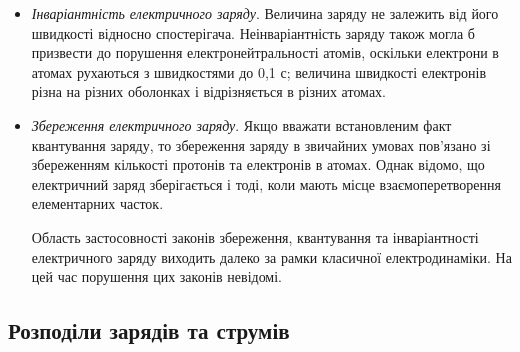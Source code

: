 \begin{itemize}
	\item \textit{Інваріантність електричного заряду}. Величина заряду не залежить від
	      його швидкості відносно спостерігача. Неінваріантність заряду також могла б
	      призвести до порушення електронейтральності атомів, оскільки електрони в
	      атомах рухаються з швидкостями до 0,1 с; величина швидкості електронів
	      різна на різних оболонках і відрізняється в різних атомах.



	\item \textit{Збереження електричного заряду}. Якщо вважати встановленим факт
	      квантування заряду, то збереження заряду в звичайних умовах пов’язано зі
	      збереженням кількості протонів та електронів в атомах. Однак відомо, що
	      електричний заряд зберігається і тоді, коли мають місце взаємоперетворення
	      елементарних часток.

	      Область застосовності законів збереження, квантування та інваріантності
	      електричного заряду виходить далеко за рамки класичної електродинаміки. На
	      цей час порушення цих законів невідомі.

\end{itemize}

\subsection*{Розподіли зарядів та струмів}


